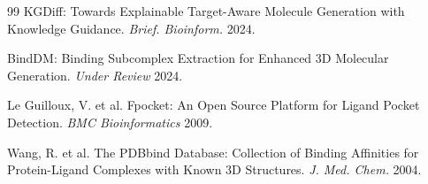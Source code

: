 \documentclass[journal=jcisd,manuscript=article]{achemso}
\begin{document}
\begin{thebibliography}{99}
 KGDiff: Towards Explainable Target-Aware Molecule Generation
with Knowledge Guidance. \emph{Brief. Bioinform.} 2024.

 BindDM: Binding Subcomplex Extraction for Enhanced 3D
Molecular Generation. \emph{Under Review} 2024.

 Le Guilloux, V. et al. Fpocket: An Open Source Platform for
Ligand Pocket Detection. \emph{BMC Bioinformatics} 2009.

 Wang, R. et al. The PDBbind Database: Collection of Binding
Affinities for Protein-Ligand Complexes with Known 3D Structures.
\emph{J. Med. Chem.} 2004.

\end{thebibliography}

\end{document}
